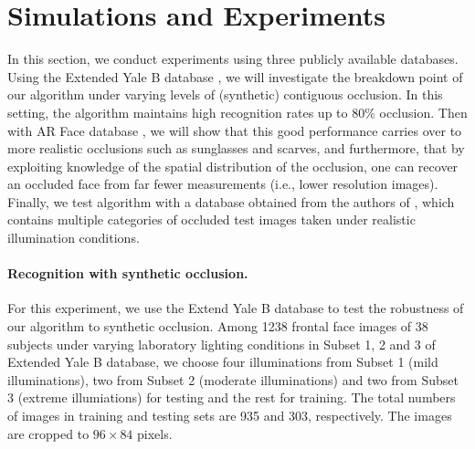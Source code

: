 \section{Simulations and Experiments} \label{sec:experiments}

In this section, we conduct experiments using three publicly available databases. Using the Extended Yale B database \cite{Georghiades2001-PAMI,Lee2005-PAMI}, we will investigate the breakdown point of our algorithm under varying levels of (synthetic) contiguous occlusion. In this setting, the algorithm maintains high recognition rates up to 80\% occlusion. Then with AR Face database \cite{Martinez1998-report}, we will show that this good performance carries over to more realistic occlusions such as sunglasses and scarves, and furthermore, that by exploiting knowledge of the spatial distribution of the occlusion, one can recover an occluded face from far fewer measurements (i.e., lower resolution images). Finally, we test algorithm with a database obtained from the authors of  \cite{WagnerA2009-CVPR}, which contains multiple categories of occluded test images taken under realistic illumination conditions. \vspace{-0mm}


\paragraph{Recognition with synthetic occlusion.}

For this experiment, we use the Extend Yale B database to test the
robustness of our algorithm to synthetic occlusion. Among 1238
frontal face images of 38 subjects under varying laboratory lighting
conditions in Subset 1, 2 and 3 of Extended Yale B database, we
choose four illuminations from Subset 1 (mild illuminations), two
from Subset 2 (moderate illuminations) and two from Subset 3
(extreme illumiations) for testing and the rest for training. The
total numbers of images in training and testing sets are 935 and 303,
respectively. The images are cropped to $96 \times 84$ pixels.

